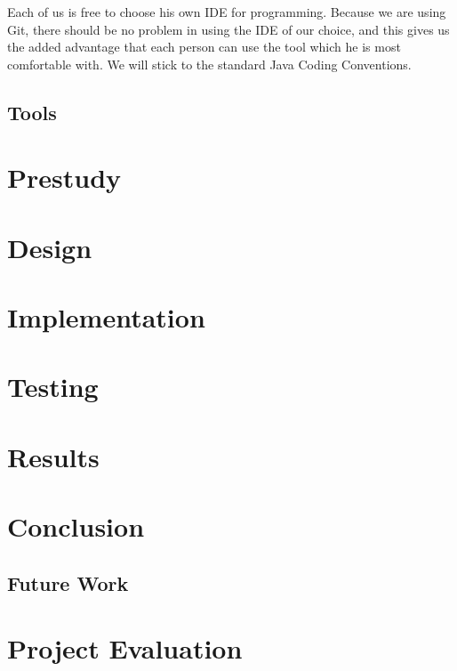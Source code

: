 \documentclass[12pt]{article}
\begin{document}
    Each of us is free to choose his own IDE for programming. Because we are using Git, there should be no problem in using the IDE of our choice, and this gives us the added advantage that each person can use the tool which he is most comfortable with. We will stick to the standard Java Coding Conventions.

    \subsection{Tools}\label{tools}
\section{Prestudy}\label{prestudy}
\section{Design}\label{design}
\section{Implementation}\label{implementation}
\section{Testing}\label{teting}
\section{Results}\label{results}
\section{Conclusion}\label{conclusion}
    \subsection{Future Work}\label{future}
\section{Project Evaluation}\label{evaluation}



\end{document}
